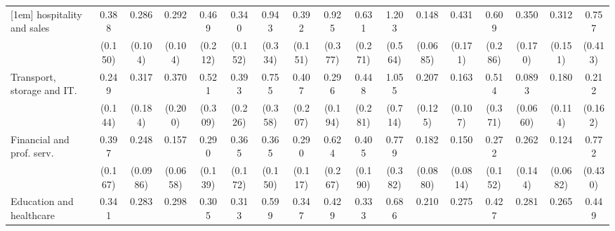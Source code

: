 {\begin{tabular}{l*{16}{c}}
[1em]
hospitality and sales&       0.388\sym{*}  &       0.286\sym{***}&       0.292\sym{***}&       0.469         &       0.340\sym{*}  &       0.943         &       0.392\sym{*}  &       0.925         &       0.631         &       1.203         &       0.148\sym{***}&       0.431\sym{*}  &       0.609         &       0.350\sym{*}  &       0.312\sym{*}  &       0.757         \\
                    &     (0.150)         &     (0.104)         &     (0.104)         &     (0.212)         &     (0.152)         &     (0.334)         &     (0.151)         &     (0.377)         &     (0.271)         &     (0.564)         &    (0.0685)         &     (0.171)         &     (0.286)         &     (0.170)         &     (0.151)         &     (0.413)         \\
[1em]
Transport, storage and IT.&       0.249\sym{*}  &       0.317\sym{*}  &       0.370         &       0.521         &       0.393         &       0.755         &       0.407         &       0.296         &       0.448         &       1.055         &       0.207\sym{**} &       0.163\sym{**} &       0.514         &      0.0893\sym{**} &       0.180\sym{**} &       0.212\sym{*}  \\
                    &     (0.144)         &     (0.184)         &     (0.200)         &     (0.309)         &     (0.226)         &     (0.358)         &     (0.207)         &     (0.194)         &     (0.281)         &     (0.714)         &     (0.125)         &     (0.107)         &     (0.371)         &    (0.0660)         &     (0.114)         &     (0.162)         \\
[1em]
Financial and prof. serv.&       0.397\sym{*}  &       0.248\sym{***}&       0.157\sym{***}&       0.290\sym{**} &       0.365\sym{*}  &       0.365\sym{*}  &       0.290\sym{**} &       0.624         &       0.405         &       0.779         &       0.182\sym{***}&       0.150\sym{***}&       0.272\sym{*}  &       0.262\sym{*}  &       0.124\sym{***}&       0.772         \\
                    &     (0.167)         &    (0.0986)         &    (0.0658)         &     (0.139)         &     (0.172)         &     (0.150)         &     (0.117)         &     (0.267)         &     (0.190)         &     (0.382)         &    (0.0880)         &    (0.0814)         &     (0.152)         &     (0.144)         &    (0.0682)         &     (0.430)         \\
[1em]
Education and healthcare&       0.341\sym{**} &       0.283\sym{**} &       0.298\sym{**} &       0.305\sym{*}  &       0.313\sym{*}  &       0.599         &       0.347\sym{**} &       0.429         &       0.333\sym{*}  &       0.686         &       0.210\sym{***}&       0.275\sym{**} &       0.427         &       0.281\sym{*}  &       0.265\sym{**} &       0.449         \\

\end{tabular}}
